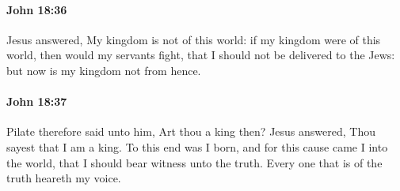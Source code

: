 		\paragraph{John 18:36} %
			\label{JOHN-18-36}

			Jesus answered, My kingdom is not of this world: if my kingdom were of this world, then would my servants fight, that I should not be delivered to the Jews: but now is my kingdom not from hence.

			\begin{framed}
				\scriptsize
				\begin{compactdesc}
					\item[SBLG] 
				\end{compactdesc}
			\end{framed}

		\paragraph{John 18:37} %
			\label{JOHN-18-37}

			Pilate therefore said unto him, Art thou a king then? Jesus answered, Thou sayest that I am a king. To this end was I born, and for this cause came I into the world, that I should bear witness unto the truth. Every one that is of the truth heareth my voice.

